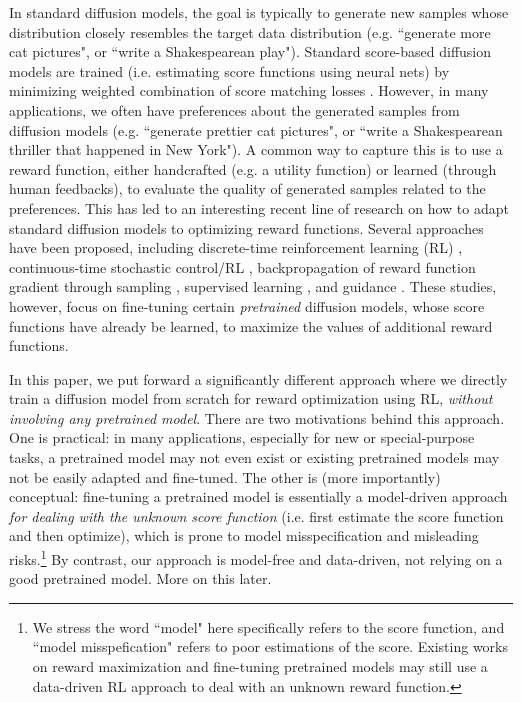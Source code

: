 \documentclass[11pt]{article}
\begin{document}
In standard diffusion models, the goal is typically to generate new samples whose distribution closely resembles the target data distribution (e.g. ``generate more cat pictures", or ``write a Shakespearean play"). Standard score-based diffusion models are trained (i.e. estimating score functions using neural nets) by minimizing weighted combination of score matching losses \citep{ hyvarinen2005estimation, vincent2011connection, song2020sliced}.
However,
in many applications, we often have preferences about the generated samples from diffusion models (e.g. ``generate prettier cat pictures", or ``write a Shakespearean thriller that happened in New York"). A common way to capture this is to use a reward function, either handcrafted (e.g. a utility function) or learned (through human feedbacks), to evaluate the quality of generated samples related to the preferences. This has led to an interesting  recent line of research on how to adapt standard diffusion models to optimizing reward functions. Several approaches have been proposed, including discrete-time reinforcement learning (RL) \citep{black2023training, fan2024reinforcement}, continuous-time stochastic control/RL \citep{uehara2024fine,tang2024score},
backpropagation of reward function gradient through sampling \citep{clark2023directly}, supervised learning \citep{lee2023aligning}, and guidance \citep{dhariwal2021diffusion}. These studies, however, focus on fine-tuning certain {\it pretrained} diffusion models, whose score functions have already be learned, to maximize the values of additional reward functions.



In this paper, we put forward a significantly different  approach where we directly train a diffusion model from scratch for reward optimization using RL, {\it without involving any pretrained model}. There are two motivations behind this approach. 
One is practical: in many applications, especially for new or special-purpose tasks,  a pretrained model may not even exist  or existing pretrained models may not be easily adapted and fine-tuned. The other is (more importantly) conceptual: fine-tuning a pretrained model is essentially a model-driven approach {\it for dealing with the unknown score function} (i.e. first estimate the score function and then optimize), which is prone to model misspecification and misleading risks.\footnote{We stress the word ``model" here specifically refers to the score function, and ``model misspefication" refers to poor estimations of the score. Existing works on reward maximization and fine-tuning pretrained models may still use a data-driven RL approach to deal with an unknown reward function.}
By contrast, our approach is model-free and data-driven, not relying on a good pretrained model. More on this later.
\end{document}

